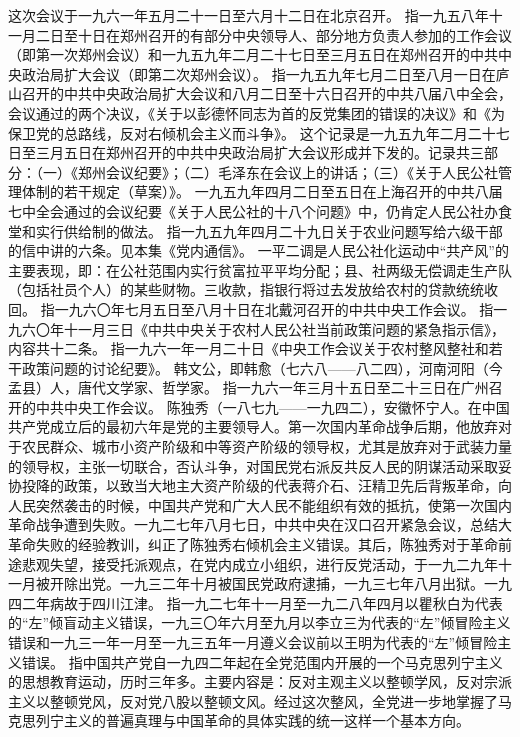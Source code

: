 \begin{maonote}
这次会议于一九六一年五月二十一日至六月十二日在北京召开。
指一九五八年十一月二日至十日在郑州召开的有部分中央领导人、部分地方负责人参加的工作会议（即第一次郑州会议）和一九五九年二月二十七日至三月五日在郑州召开的中共中央政治局扩大会议（即第二次郑州会议）。
指一九五九年七月二日至八月一日在庐山召开的中共中央政治局扩大会议和八月二日至十六日召开的中共八届八中全会，会议通过的两个决议，《关于以彭德怀同志为首的反党集团的错误的决议》和《为保卫党的总路线，反对右倾机会主义而斗争》。
这个记录是一九五九年二月二十七日至三月五日在郑州召开的中共中央政治局扩大会议形成并下发的。记录共三部分：（一）《郑州会议纪要》；（二）毛泽东在会议上的讲话；（三）《关于人民公社管理体制的若干规定（草案）》。
一九五九年四月二日至五日在上海召开的中共八届七中全会通过的会议纪要《关于人民公社的十八个问题》中，仍肯定人民公社办食堂和实行供给制的做法。
指一九五九年四月二十九日关于农业问题写给六级干部的信中讲的六条。见本集《党内通信》。
一平二调是人民公社化运动中“共产风”的主要表现，即：在公社范围内实行贫富拉平平均分配；县、社两级无偿调走生产队（包括社员个人）的某些财物。三收款，指银行将过去发放给农村的贷款统统收回。
指一九六〇年七月五日至八月十日在北戴河召开的中共中央工作会议。
指一九六〇年十一月三日《中共中央关于农村人民公社当前政策问题的紧急指示信》，内容共十二条。
指一九六一年一月二十日《中央工作会议关于农村整风整社和若干政策问题的讨论纪要》。
韩文公，即韩愈（七六八——八二四），河南河阳（今孟县）人，唐代文学家、哲学家。
指一九六一年三月十五日至二十三日在广州召开的中共中央工作会议。
陈独秀（一八七九——一九四二），安徽怀宁人。在中国共产党成立后的最初六年是党的主要领导人。第一次国内革命战争后期，他放弃对于农民群众、城市小资产阶级和中等资产阶级的领导权，尤其是放弃对于武装力量的领导权，主张一切联合，否认斗争，对国民党右派反共反人民的阴谋活动采取妥协投降的政策，以致当大地主大资产阶级的代表蒋介石、汪精卫先后背叛革命，向人民突然袭击的时候，中国共产党和广大人民不能组织有效的抵抗，使第一次国内革命战争遭到失败。一九二七年八月七日，中共中央在汉口召开紧急会议，总结大革命失败的经验教训，纠正了陈独秀右倾机会主义错误。其后，陈独秀对于革命前途悲观失望，接受托派观点，在党内成立小组织，进行反党活动，于一九二九年十一月被开除出党。一九三二年十月被国民党政府逮捕，一九三七年八月出狱。一九四二年病故于四川江津。
指一九二七年十一月至一九二八年四月以瞿秋白为代表的“左”倾盲动主义错误，一九三〇年六月至九月以李立三为代表的“左”倾冒险主义错误和一九三一年一月至一九三五年一月遵义会议前以王明为代表的“左”倾冒险主义错误。
指中国共产党自一九四二年起在全党范围内开展的一个马克思列宁主义的思想教育运动，历时三年多。主要内容是：反对主观主义以整顿学风，反对宗派主义以整顿党风，反对党八股以整顿文风。经过这次整风，全党进一步地掌握了马克思列宁主义的普遍真理与中国革命的具体实践的统一这样一个基本方向。

\end{maonote}
